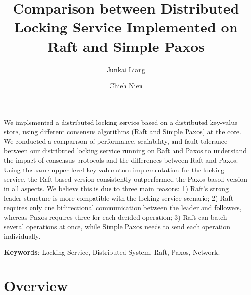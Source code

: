 \documentclass[11pt,a4paper]{article}
\title{Comparison between Distributed Locking Service Implemented on Raft and Simple Paxos  }
\author[1]{Junkai Liang}
\author[1]{Chieh Nien}
\affil[1]{\small Computer Science Department, Viterbi School of Engineering, University of Southern California}
\date{}  %
\begin{document}
\maketitle

\begin{abstract}

\end{abstract}
We implemented a distributed locking service based on a distributed key-value store, using different consensus algorithms (Raft and Simple Paxos) at the core. We conducted a comparison of performance, scalability, and fault tolerance between our distributed locking service running on Raft and Paxos to understand the impact of consensus protocols and the differences between Raft and Paxos. Using the same upper-level key-value store implementation for the locking service, the Raft-based version consistently outperformed the Paxos-based version in all aspects. We believe this is due to three main reasons: 1) Raft's strong leader structure is more compatible with the locking service scenario; 2) Raft requires only one bidirectional communication between the leader and followers, whereas Paxos requires three for each decided operation; 3) Raft can batch several operations at once, while Simple Paxos needs to send each operation individually.

\textbf{Keywords}: Locking Service, Distributed System, Raft, Paxos, Network.

\section{Overview}


\end{document}
